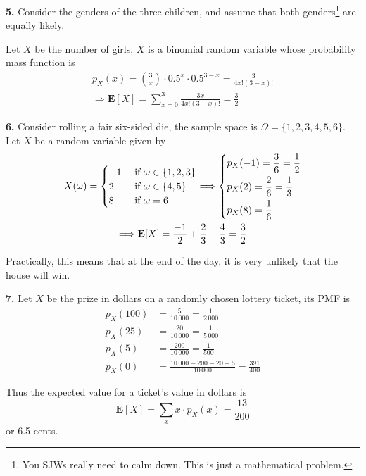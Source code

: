 \documentclass[a4paper,12pt]{article}
\newcommand{\E}{\mathbf E}
\newcommand{\exercise}[1]{\noindent\textbf{#1.}}
\begin{document}
\exercise 5  Consider the genders of the three children, and assume
that both genders\footnote{You SJWs really need to calm down.
This is just a mathematical problem.} are equally likely.

Let $X$ be the number of girls, $X$ is a binomial random variable
whose probability mass function is
\begin{multline*}
  p_X(x) = \binom{3}{x}\cdot 0.5^x\cdot 0.5^{3-x} = \frac{3}{4x!(3-x)!}\\
  \Longrightarrow \E[X] = \sum_{x=0}^3\frac{3x}{4x!(3-x)!} = \frac 3 2
\end{multline*}

\exercise 6  Consider rolling a fair six-sided die, the sample space is
$\Omega = \{1, 2, 3, 4, 5, 6\}$.  Let $X$ be a random variable given by
\begin{multline*}
  X(\omega) = \begin{cases}
    -1&\text{ if }\omega \in \{1, 2, 3\}\\
    2&\text{  if }\omega \in \{4, 5\}\\
    8&\text{  if }\omega = 6
  \end{cases}
  \Longrightarrow\begin{dcases}
    p_X(-1) = \frac{3}{6} = \frac{1}{2}\\
    p_X(2) = \frac{2}{6} = \frac{1}{3}\\
    p_X(8) = \frac{1}{6}
  \end{dcases}\\
  \Longrightarrow \E[X] = \frac{-1}{2} + \frac{2}{3} + \frac{4}{3} = \frac{3}{2}
\end{multline*}

Practically, this means that at the end of the day,
it is very unlikely that the house will win.

\exercise 7  Let $X$ be the prize in dollars on a randomly chosen
lottery ticket, its PMF is
\begin{align*}
  p_X(100) &= \frac{5}{10\,000} = \frac{1}{2\,000}\\
  p_X(25) &= \frac{20}{10\,000} = \frac{1}{5\,000}\\
  p_X(5) &= \frac{200}{10\,000} = \frac{1}{500}\\
  p_X(0) &= \frac{10\,000-200-20-5}{10\,000} = \frac{391}{400}
\end{align*}

Thus the expected value for a ticket's value in dollars is
\[\E[X] = \sum_x x\cdot p_X(x) = \frac{13}{200}\]
or 6.5 cents.
\end{document}
